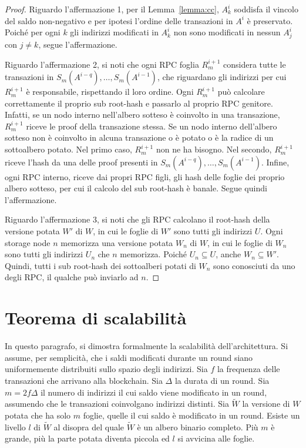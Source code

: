 \begin{proof}
Riguardo l'affermazione 1, per il Lemma~\ref{lemma:cc}, $A_k^i$ soddisfa il vincolo del saldo non-negativo e per ipotesi l'ordine delle transazioni in $A^i$ è preservato. Poiché per ogni $k$ gli indirizzi modificati in $A_k^i$ non sono modificati in nessun $A_j^i$ con $j \neq k$, segue l'affermazione.

Riguardo l'affermazione 2, si noti che ogni RPC foglia $R_m^{i+1}$ considera tutte le transazioni in $S_m(A^{i-q}), \dots, S_m(A^{i-1})$, che riguardano gli indirizzi per cui $R_m^{i+1}$ è responsabile, rispettando il loro ordine. Ogni $R_m^{i+1}$ può calcolare correttamente il proprio sub root-hash e passarlo al proprio RPC genitore. Infatti, se un nodo interno nell'albero sotteso è coinvolto in una transazione, $R_m^{i+1}$ riceve le proof della transazione stessa. Se un nodo interno dell'albero sotteso non è coinvolto in alcuna transazione o è potato o è la radice di un sottoalbero potato. Nel primo caso, $R_m^{i+1}$ non ne ha bisogno. Nel secondo, $R_m^{i+1}$ riceve l'hash da una delle proof presenti in $S_m(A^{i-q}), \dots, S_m(A^{i-1})$. Infine, ogni RPC interno, riceve dai propri RPC figli, gli hash delle foglie dei proprio albero sotteso, per cui il calcolo del sub root-hash è banale. Segue quindi l'affermazione.

Riguardo l'affermazione 3, si noti che gli RPC calcolano il root-hash della versione potata $W'$ di $W$, in cui le foglie di $W'$ sono tutti gli indirizzi $U$. Ogni storage node $n$ memorizza una versione potata $W_n$ di $W$, in cui le foglie di $W_n$ sono tutti gli indirizzi $U_n$ che $n$ memorizza. Poiché $U_n \subseteq U$, anche $W_n \subseteq W'$. Quindi, tutti i sub root-hash dei sottoalberi potati di $W_n$ sono conosciuti da uno degli RPC, il qualche può inviarlo ad $n$.
\end{proof}


\section{Teorema di scalabilità}

In questo paragrafo, si dimostra formalmente la scalabilità dell'architettura. Si assume, per semplicità, che i saldi modificati durante un round siano uniformemente distribuiti sullo spazio degli indirizzi.
Sia $f$ la frequenza delle transazioni che arrivano alla blockchain. Sia $\Delta$ la durata di un round. Sia $m = 2 f \Delta$ il numero di indirizzi il cui saldo viene modificato in un round, assumendo che le transazioni coinvolgano indirizzi distinti. Sia $\tilde{W}$ la versione di $W$ potata che ha solo $m$ foglie, quelle il cui saldo è modificato in un round. Esiste un livello $l$ di $\tilde{W}$ al disopra del quale $\tilde{W}$ è un albero binario completo. Più $m$ è grande, più la parte potata diventa piccola ed $l$ si avvicina alle foglie.

